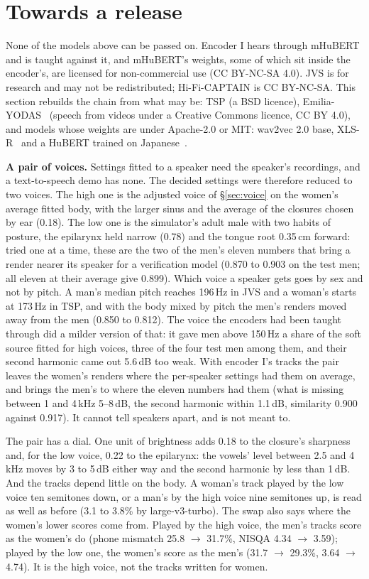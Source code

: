 \documentclass[10pt,a4paper,twocolumn]{article}
\begin{document}
\section{Towards a release}\label{sec:release}

None of the models above can be passed on. Encoder I hears through mHuBERT and is taught against
it, and mHuBERT's weights, some of which sit inside the encoder's, are licensed for non-commercial
use (CC BY-NC-SA 4.0). JVS is for research and may not be redistributed; Hi-Fi-CAPTAIN is
CC BY-NC-SA. This section rebuilds the chain from what may be: TSP (a BSD licence),
Emilia-YODAS~\cite{emilia} (speech from videos under a Creative Commons licence, CC BY 4.0), and
models whose weights are under Apache-2.0 or MIT: wav2vec 2.0 base, XLS-R~\cite{xlsr} and a
HuBERT trained on Japanese~\cite{jtube}.

\textbf{A pair of voices.} Settings fitted to a speaker need the speaker's recordings, and a
text-to-speech demo has none. The decided settings were therefore reduced to two voices. The high
one is the adjusted voice of \S\ref{sec:voice} on the women's average fitted body, with the larger
sinus and the average of the closures chosen by ear (0.18). The low one is the simulator's adult
male with two habits of posture, the epilarynx held narrow (0.78) and the tongue root 0.35\,cm
forward: tried one at a time, these are the two of the men's eleven numbers that bring a render
nearer its speaker for a verification model (0.870 to 0.903 on the test men; all eleven at their
average give 0.899). Which voice a speaker gets goes by sex and not by pitch. A man's median pitch
reaches 196\,Hz in JVS and a woman's starts at 173\,Hz in TSP, and with the body mixed by pitch
the men's renders moved away from the men (0.850 to 0.812). The voice the encoders had been
taught through did a milder version of that: it gave men above 150\,Hz a share of the soft source
fitted for high voices, three of the four test men among them, and their second harmonic came
out 5.6\,dB too weak. With encoder I's tracks the pair leaves the women's renders where the
per-speaker settings had them on average, and brings the men's to where the eleven numbers had
them (what is missing between 1 and 4\,kHz 5--8\,dB, the second harmonic within 1.1\,dB,
similarity 0.900 against 0.917). It cannot tell speakers apart, and is not meant to.

The pair has a dial. One unit of brightness adds 0.18 to the closure's sharpness and, for the low
voice, 0.22 to the epilarynx: the vowels' level between 2.5 and 4\,kHz moves by 3 to 5\,dB either
way and the second harmonic by less than 1\,dB. And the tracks depend little on the body. A
woman's track played by the low voice ten semitones down, or a man's by the high voice nine
semitones up, is read as well as before (3.1 to 3.8\% by large-v3-turbo). The swap also says
where the women's lower scores come from. Played by the high voice, the men's tracks score as the
women's do (phone mismatch 25.8 $\rightarrow$ 31.7\%, NISQA 4.34 $\rightarrow$ 3.59); played by
the low one, the women's score as the men's (31.7 $\rightarrow$ 29.3\%, 3.64 $\rightarrow$ 4.74).
It is the high voice, not the tracks written for women.
\end{document}
